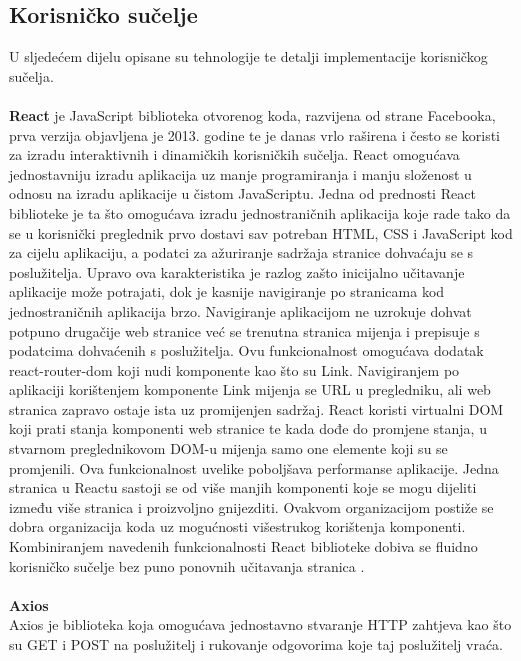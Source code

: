 \documentclass[times, utf8, zavrsni]{fer}
\begin{document}
\subsection{Korisničko sučelje}
U sljedećem dijelu opisane su tehnologije te detalji implementacije korisničkog sučelja.
\\
\\ \textbf{React} je JavaScript biblioteka otvorenog koda, razvijena od strane Facebooka,
prva verzija objavljena je 2013. godine te je danas vrlo raširena i često se koristi za izradu interaktivnih i dinamičkih korisničkih sučelja. 
React omogućava jednostavniju izradu aplikacija uz manje programiranja i manju složenost u odnosu na izradu aplikacije u čistom JavaScriptu.
Jedna od prednosti React biblioteke je ta što omogućava izradu jednostraničnih aplikacija  koje rade tako 
da se u korisnički preglednik prvo dostavi 
sav potreban HTML, CSS i JavaScript kod za cijelu aplikaciju, a podatci za ažuriranje sadržaja stranice dohvaćaju se 
s poslužitelja. Upravo ova karakteristika je razlog zašto inicijalno učitavanje aplikacije može potrajati, dok je kasnije navigiranje po stranicama kod jednostraničnih aplikacija brzo.
Navigiranje aplikacijom ne uzrokuje dohvat potpuno drugačije web stranice već se trenutna stranica 
mijenja i prepisuje s podatcima dohvaćenih s poslužitelja. Ovu funkcionalnost omogućava dodatak react-router-dom koji nudi komponente kao što su Link.
Navigiranjem po aplikaciji korištenjem komponente Link mijenja se URL u pregledniku, ali web stranica zapravo ostaje ista uz promijenjen sadržaj.
React koristi virtualni DOM  koji prati stanja 
komponenti web stranice te kada dođe do promjene stanja, u stvarnom preglednikovom DOM-u mijenja samo one elemente koji su se promjenili. Ova 
funkcionalnost uvelike poboljšava performanse aplikacije.
Jedna stranica u Reactu sastoji se od više manjih komponenti koje se mogu dijeliti \\između više stranica i proizvoljno gnijezditi. Ovakvom organizacijom
postiže se dobra organizacija koda uz mogućnosti višestrukog korištenja komponenti.
Kombiniranjem navedenih funkcionalnosti React biblioteke dobiva se fluidno korisničko sučelje bez puno ponovnih učitavanja stranica .
\\
\\ \textbf{Axios}
\\ Axios je biblioteka koja omogućava jednostavno stvaranje HTTP zahtjeva kao što su GET i POST na poslužitelj i rukovanje odgovorima koje taj poslužitelj vraća.
\end{document}
